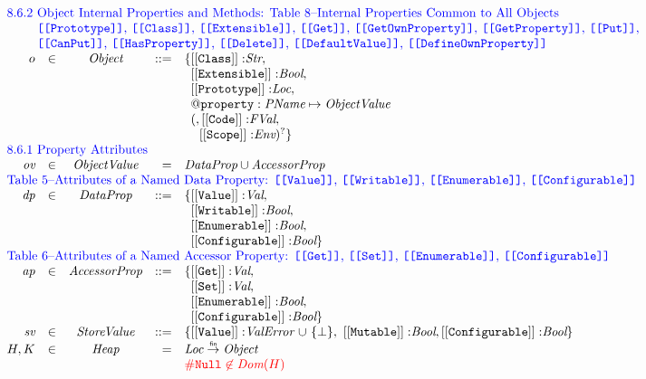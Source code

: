 \[\begin{array}{rlcrll}
%
\multicolumn{6}{l}{\mbox{\inblue 8.6.2 Object Internal Properties and Methods:
Table 8--Internal Properties Common to All Objects}}\\
\multicolumn{6}{l}{\mbox{\inblue\phantom{8.6.2}
{\tt[[Prototype]]}, {\tt[[Class]]}, {\tt[[Extensible]]}, {\tt[[Get]]}, {\tt[[GetOwnProperty]]},
{\tt[[GetProperty]]}, {\tt[[Put]]},}}\\
\multicolumn{6}{l}{\mbox{\inblue\phantom{8.6.2}
{\tt[[CanPut]]}, {\tt[[HasProperty]]}, {\tt[[Delete]]},
{\tt[[DefaultValue]]}, {\tt[[DefineOwnProperty]]}
}}\\

o & \in & \Obj & ::= &
 {\tt \{[[Class]]:} \Str,\\
&&&& \phantom{\{}{\tt [[Extensible]]:} \Bool,& \\
&&&& \phantom{\{}{\tt [[Prototype]]:} \Loc,& \\
&&&& \phantom{\{}{\tt @property: \pname\mapsto\ObjV}& \\
&&&& \phantom{\{}(,{\tt [[Code]]:} \FVal,\\
&&&& \phantom{\{(,}{\tt [[Scope]]:} \Env)^?\} & \\
%
%

\multicolumn{6}{l}{\mbox{\inblue 8.6.1 Property Attributes}}\\
\emph{ov} & \in & \ObjV & = & \emph{DataProp} \cup \emph{AccessorProp}\\

\multicolumn{6}{l}{\mbox{\inblue Table 5--Attributes of a Named Data Property:
{\tt [[Value]]}, {\tt [[Writable]]}, {\tt [[Enumerable]]}, {\tt [[Configurable]]}}}\\
\emph{dp} & \in & \emph{DataProp} & ::= &
 \{{\tt [[Value]]:} \Val ,\\
&&&& \phantom{\{}{\tt [[Writable]]:} \Bool,& \\
&&&& \phantom{\{}{\tt [[Enumerable]]:} \Bool,& \\
&&&& \phantom{\{}{\tt [[Configurable]]:} \Bool\}& \\

\multicolumn{6}{l}{\mbox{\inblue Table 6--Attributes of a Named Accessor Property:
{\tt [[Get]]}, {\tt [[Set]]}, {\tt [[Enumerable]]}, {\tt [[Configurable]]}}}\\
\emph{ap} & \in & \emph{AccessorProp} & ::= &
 \{{\tt [[Get]]:} \Val ,\\
&&&& \phantom{\{}{\tt [[Set]]:} \Val,& \\
&&&& \phantom{\{}{\tt [[Enumerable]]:} \Bool,& \\
&&&& \phantom{\{}{\tt [[Configurable]]:} \Bool\}& \\

\emph{sv}&\in&\sv & ::= &
\{{\tt [[Value]]:}\ve\
{\cup\ \{\bot\}},\
{\tt [[Mutable]]:}\Bool,
{\tt [[Configurable]]:}\Bool\}\\

H, K & \in & \Heap & = & \Loc \finto \Obj\\
&&&&\mbox{\inred $\nullL\not\in\hf{Dom}(H)$}\\



\end{array}
\]



